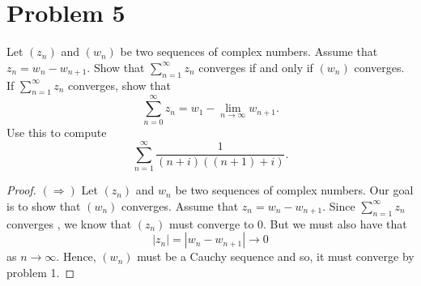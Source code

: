 \documentclass[a4paper]{article}
\begin{document}
\section*{Problem 5}
Let \( ({z}_{n}) \) and \( ({w}_{n}) \) be two sequences of complex numbers. Assume that \( {z}_{n} = {w}_{n} - {w}_{n +1}  \). Show that \( \sum_{ n=1  }^{ \infty   } {z}_{n}  \) converges if and only if \( ({w}_{n}) \) converges. If \( \sum_{ n=1  }^{ \infty } {z}_{n} \) converges, show that 
\[  \sum_{ n=0 }^{ \infty  } {z}_{n} = {w}_{1} - \lim_{ n \to \infty  } {w}_{n+1}. \]
Use this to compute 
\[  \sum_{ n=1  }^{  \infty  } \frac{ 1 }{ (n+i)((n+1)+i) }.  \]
\begin{proof}
    \( (\Rightarrow) \) Let \( ({z}_{n}) \) and \( {w}_{n} \) be two sequences of complex numbers. Our goal is to show that \( ({w}_{n}) \) converges. Assume that \( {z}_{n} = {w}_{n} - {w}_{n+1} \). Since \( \sum_{ n=1  }^{ \infty  } {z}_{n} \) converges , we know that \( ({z}_{n}) \) must converge to \( 0 \). But we must also have that 
\[  | {z}_{n} |  = | {w}_{n} - {w}_{n+1} | \to 0  \]
as \( n \to \infty   \). Hence, \( ({w}_{n}) \) must be a Cauchy sequence and so, it must converge by problem 1.   


\end{proof}
\end{document}
